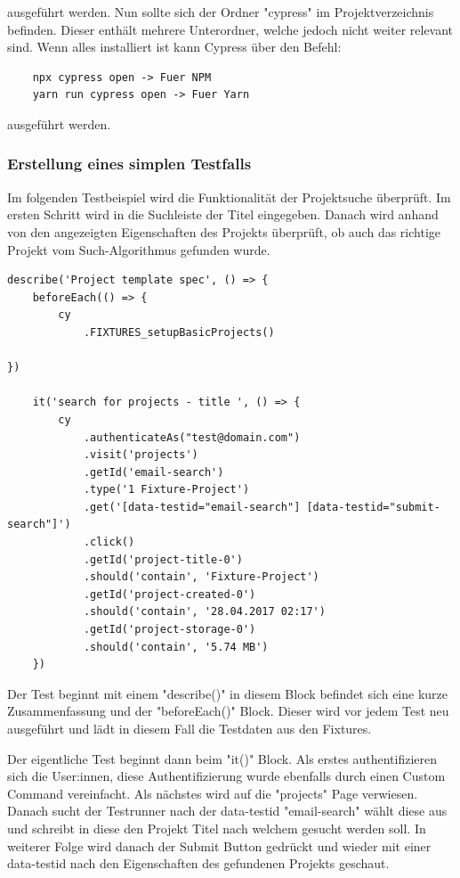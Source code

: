 ausgeführt werden.
Nun sollte sich der Ordner "cypress" im Projektverzeichnis befinden. Dieser enthält mehrere Unterordner, welche jedoch nicht weiter relevant sind. Wenn alles installiert ist kann Cypress über den Befehl:

\begin{lstlisting}
    npx cypress open -> Fuer NPM
    yarn run cypress open -> Fuer Yarn
\end{lstlisting}

ausgeführt werden.
\cite{Integration_von_Cypress}
\newpage
\subsubsection{Erstellung eines simplen Testfalls}
Im folgenden Testbeispiel wird die Funktionalität der Projektsuche überprüft. Im ersten Schritt wird in die Suchleiste der Titel eingegeben. Danach wird anhand von den angezeigten Eigenschaften des Projekts überprüft, ob auch das richtige Projekt vom Such-Algorithmus gefunden wurde. 

\begin{lstlisting}[caption=Erstellen eines simplen Testfalls]
describe('Project template spec', () => {
    beforeEach(() => {
        cy
            .FIXTURES_setupBasicProjects()

})
    
    it('search for projects - title ', () => {
        cy
            .authenticateAs("test@domain.com")
            .visit('projects')
            .getId('email-search')
            .type('1 Fixture-Project')
            .get('[data-testid="email-search"] [data-testid="submit-search"]')
            .click()
            .getId('project-title-0')
            .should('contain', 'Fixture-Project')
            .getId('project-created-0')
            .should('contain', '28.04.2017 02:17')
            .getId('project-storage-0')
            .should('contain', '5.74 MB')
    })
\end{lstlisting}

Der Test beginnt mit einem "describe()" in diesem Block befindet sich eine kurze Zusammenfassung und der "beforeEach()" Block. Dieser wird vor jedem Test neu ausgeführt und lädt in diesem Fall die Testdaten aus den Fixtures.

Der eigentliche Test beginnt dann beim "it()" Block. Als erstes authentifizieren sich die User:innen, diese Authentifizierung wurde ebenfalls durch einen Custom Command vereinfacht. Als nächstes wird auf die "projects" Page verwiesen. Danach sucht der Testrunner nach der data-testid "email-search" wählt diese aus und schreibt in diese den Projekt Titel nach welchem gesucht werden soll. In weiterer Folge wird danach der Submit Button gedrückt und wieder mit einer data-testid nach den Eigenschaften des gefundenen Projekts geschaut.

